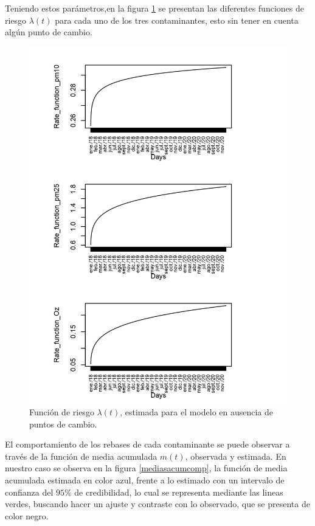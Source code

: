 Teniendo estos parámetros,en la figura \ref{riesgo} se presentan las diferentes funciones de riesgo $\lambda (t)$ para cada uno de los tres contaminantes, esto sin tener en cuenta algún punto de cambio. 



\begin{figure}[!h]
\begin{center}
\includegraphics[width=15cm]{rate_function_spdc}
\end{center}
\centering
\caption{ Función de riesgo $\lambda (t) $, estimada para el modelo en ausencia de puntos de cambio.  }
\label{riesgo}
\end{figure}


El comportamiento de los rebases de cada contaminante se puede observar a través de la función de media acumulada $m(t)$, observada y estimada. En nuestro caso se observa en la figura  \ref{mediasacumcomp}, la función de media acumulada estimada en color azul, frente a lo estimado con un intervalo de confianza del $95\%$ de credibilidad, lo cual se representa mediante las lineas verdes, buscando hacer un ajuste y contraste con lo observado, que se presenta de color negro.




